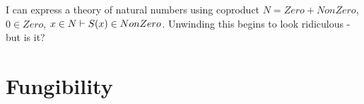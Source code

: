 \documentclass[10pt,a4paper]{article}
\theoremstyle{remark}
\begin{document}
I can express a theory of natural numbers using coproduct $N = Zero + NonZero$,
$0 \in Zero$, $x \in N \vdash S(x) \in NonZero$.   Unwinding this begins to look ridiculous - but is it?


\section{Fungibility} 




%

 

\end{document}
